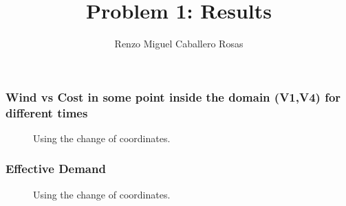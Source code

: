 \documentclass[aspectratio=169]{beamer}\usepackage[utf8]{inputenc}
\title{Problem 1: Results}
\subtitle{Renzo Miguel Caballero Rosas}
\begin{document}
\begin{frame}
\titlepage
\end{frame}

\begin{frame}\frametitle{Wind vs Cost in some point inside the domain (V1,V4) for different times}
\begin{figure}[ht!]
\centering
{}
\caption{Using the change of coordinates.}
\end{figure}
\end{frame}

\begin{frame}\frametitle{Effective Demand}
\begin{figure}[ht!]
\centering
{}
\caption{Using the change of coordinates.}
\end{figure}
\end{frame}
\end{document}
